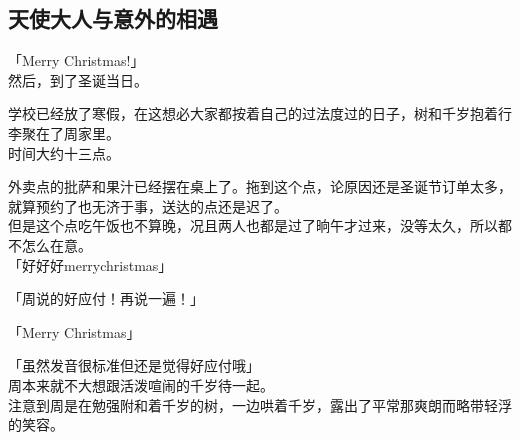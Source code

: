 \subsection{天使大人与意外的相遇}


「Merry Christmas!」\\

然后，到了圣诞当日。

学校已经放了寒假，在这想必大家都按着自己的过法度过的日子，树和千岁抱着行李聚在了周家里。\\

时间大约十三点。

外卖点的批萨和果汁已经摆在桌上了。拖到这个点，论原因还是圣诞节订单太多，就算预约了也无济于事，送达的点还是迟了。\\

但是这个点吃午饭也不算晚，况且两人也都是过了晌午才过来，没等太久，所以都不怎么在意。\\

「好好好merrychristmas」

「周说的好应付！再说一遍！」

「Merry Christmas」

「虽然发音很标准但还是觉得好应付哦」\\

周本来就不大想跟活泼喧闹的千岁待一起。\\

注意到周是在勉强附和着千岁的树，一边哄着千岁，露出了平常那爽朗而略带轻浮的笑容。\\

